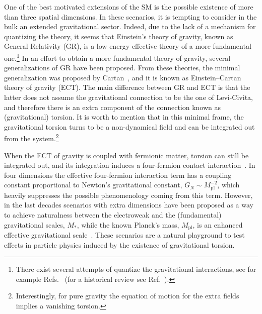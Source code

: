 \documentclass{ws-mpla}
\renewcommand{\(}{\left(}
\renewcommand{\)}{\right)}
\renewcommand{\[}{\left[}
\renewcommand{\]}{\right]}
\begin{document}
One of the best motivated extensions of the SM is the possible existence of more than three spatial dimensions. In these scenarios, it is tempting to consider in the bulk an extended gravitational sector. Indeed, due to the lack of a mechanism for quantizing the theory, it seems that Einstein's theory of gravity, known as General Relativity (GR), is a low energy effective theory of a more fundamental one.\footnote{There exist several attempts of quantize the gravitational interactions, see for example Refs.~ (for a historical review see Ref.~).} In an effort to obtain a more fundamental theory of gravity, several generalizations of GR have been proposed. From these theories, the minimal generalization was proposed by Cartan~\cite{Cartan1922,Cartan1923,Cartan1924,Cartan1925,Cartan-Einstein}, and it is known as Einstein--Cartan theory of gravity (ECT). The main difference between GR and ECT is that the latter does not assume the gravitational connection to be the one of Levi-Civita, and therefore there is an extra component of the connection known as (gravitational) torsion. It is worth to mention that in this minimal frame, the gravitational torsion turns to be a non-dynamical field and can be integrated out from the system.\footnote{Interestingly, for pure gravity the equation of motion for the extra fields implies a vanishing torsion.}

When the ECT of gravity is coupled with fermionic matter, torsion can still be integrated out, and its integration induces a four-fermion contact interaction~\cite{Kibble:1961ba,Hehl:1976kj,Shapiro:2001rz,Hammond:2002rm,SUGRA-book}. In four dimensions the effective four-fermion interaction term has a coupling constant proportional to Newton's gravitational constant, $G_N\sim M_{\text{pl}}^{-2}$, which heavily suppresses the possible phenomenology coming from this term.
However, in the last decades scenarios with extra dimensions have been proposed as a way to achieve naturalness between the electroweak and the (fundamental) gravitational scales, $M_*$, while the known Planck's mass, $M_{\text{pl}}$, is an enhanced effective gravitational scale~\cite{ADD1,AADD,ADD2,RS1,RS2}. These scenarios are a natural playground to test effects in particle physics induced by the existence of gravitational torsion.
\end{document}
